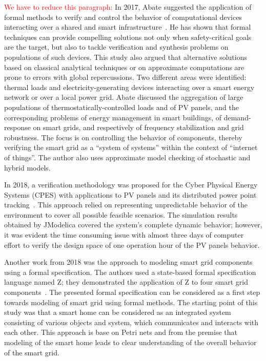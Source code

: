 \documentclass[runningheads]{llncs}
\begin{document}
\textcolor{red}{We have to reduce this paragraph:} In 2017, Abate suggested the application of formal methods to verify and control the behavior of computational devices interacting over a shared and smart infrastructure~\cite{Abate2017}. He has shown that formal techniques can provide compelling solutions not only when safety-critical goals are the target, but also to tackle verification and synthesis problems on populations of such devices. This study also argued that alternative solutions based on classical analytical techniques or on approximate computations are prone to errors with global repercussions. Two different areas were identified: thermal loads and electricity-generating devices interacting over a smart energy network or over a local power grid. Abate discussed the aggregation of large populations of thermostatically-controlled loads and of PV panels, and the corresponding problems of energy management in smart buildings, of demand-response on smart grids, and respectively of frequency stabilization and grid robustness. The focus is on controlling the behavior of components, thereby verifying the smart grid as a ``system of systems'' within the context of ``internet of things''. The author also uses approximate model checking of stochastic and hybrid models.

In 2018, a verification methodology was proposed for the Cyber Physical Energy Systems (CPES) with applications to PV panels and its distributed power point tracking~\cite{Driouich2018}. This approach relied on representing unpredictable behavior of the environment to cover all possible feasible scenarios. The simulation results obtained by JModelica covered the system's complete dynamic behavior; however, it was evident the time consuming issue with almost three days of computer effort to verify the design space of one operation hour of the PV panels behavior. %

Another work from 2018 was the approach to modeling smart grid components using a formal specification. The authors used a state-based formal specification language named Z; they demonstrated the application of Z to four smart grid components~\cite{Akram2018}. The presented formal specification can be considered as a first step towards modeling of smart grid using formal methods. The starting point of this study was that a smart home can be considered as an integrated system consisting of various objects and system, which communicates and interacts with each other. This approach is base on Petri nets and from the premise that modeling of the smart home leads to clear understanding of the overall behavior of the smart grid.
\end{document}
